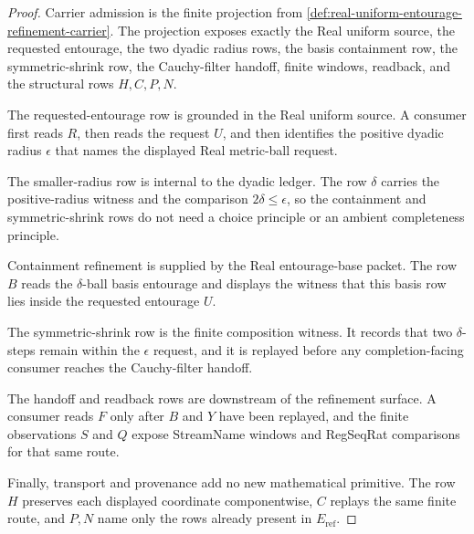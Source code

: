 \begin{proof}
Carrier admission is the finite projection from \autoref{def:real-uniform-entourage-refinement-carrier}. The projection exposes exactly the Real uniform source, the requested entourage, the two dyadic radius rows, the basis containment row, the symmetric-shrink row, the Cauchy-filter handoff, finite windows, readback, and the structural rows $H,C,P,N$.

The requested-entourage row is grounded in the Real uniform source. A consumer first reads $R$, then reads the request $U$, and then identifies the positive dyadic radius $\epsilon$ that names the displayed Real metric-ball request.

The smaller-radius row is internal to the dyadic ledger. The row $\delta$ carries the positive-radius witness and the comparison $2\delta\leq\epsilon$, so the containment and symmetric-shrink rows do not need a choice principle or an ambient completeness principle.

Containment refinement is supplied by the Real entourage-base packet. The row $B$ reads the $\delta$-ball basis entourage and displays the witness that this basis row lies inside the requested entourage $U$.

The symmetric-shrink row is the finite composition witness. It records that two $\delta$-steps remain within the $\epsilon$ request, and it is replayed before any completion-facing consumer reaches the Cauchy-filter handoff.

The handoff and readback rows are downstream of the refinement surface. A consumer reads $F$ only after $B$ and $Y$ have been replayed, and the finite observations $S$ and $Q$ expose StreamName windows and RegSeqRat comparisons for that same route.

Finally, transport and provenance add no new mathematical primitive. The row $H$ preserves each displayed coordinate componentwise, $C$ replays the same finite route, and $P,N$ name only the rows already present in $E_{\mathrm{ref}}$.
\end{proof}

